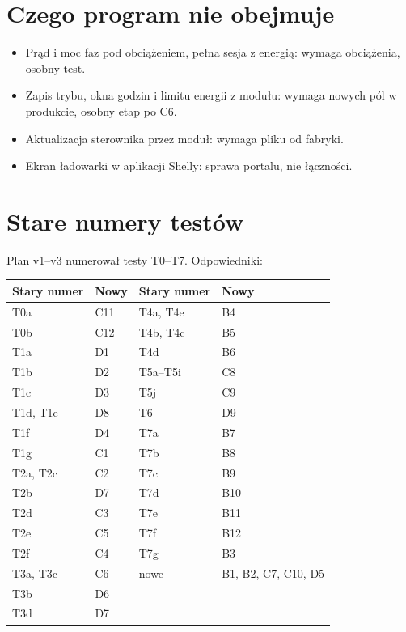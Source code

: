 \documentclass[11pt,a4paper]{article}
\begin{document}
\section{Czego program nie obejmuje}

\begin{itemize}
\item Prąd i moc faz pod obciążeniem, pełna sesja z energią: wymaga obciążenia, osobny test.
\item Zapis trybu, okna godzin i limitu energii z modułu: wymaga nowych pól w produkcie, osobny etap po C6.
\item Aktualizacja sterownika przez moduł: wymaga pliku od fabryki.
\item Ekran ładowarki w aplikacji Shelly: sprawa portalu, nie łączności.
\end{itemize}

\section{Stare numery testów}

Plan v1–v3 numerował testy T0–T7. Odpowiedniki:


\begin{longtable}{>{\raggedright\arraybackslash}p{3.71cm}>{\raggedright\arraybackslash}p{3.71cm}>{\raggedright\arraybackslash}p{3.71cm}>{\raggedright\arraybackslash}p{3.71cm}}
\toprule
\rowcolor{apteallight}\textbf{Stary numer} & \textbf{Nowy} & \textbf{Stary numer} & \textbf{Nowy} \\
\midrule\endhead
\bottomrule\endfoot
T0a & C11 & T4a, T4e & B4 \\
T0b & C12 & T4b, T4c & B5 \\
T1a & D1 & T4d & B6 \\
T1b & D2 & T5a–T5i & C8 \\
T1c & D3 & T5j & C9 \\
T1d, T1e & D8 & T6 & D9 \\
T1f & D4 & T7a & B7 \\
T1g & C1 & T7b & B8 \\
T2a, T2c & C2 & T7c & B9 \\
T2b & D7 & T7d & B10 \\
T2d & C3 & T7e & B11 \\
T2e & C5 & T7f & B12 \\
T2f & C4 & T7g & B3 \\
T3a, T3c & C6 & nowe & B1, B2, C7, C10, D5 \\
T3b & D6 &  &  \\
T3d & D7 &  &  \\
\end{longtable}
\end{document}
